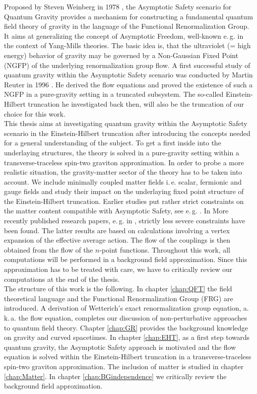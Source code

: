 Proposed by Steven Weinberg in 1978 \cite{Weinberg1980}, the Asymptotic Safety scenario for Quantum Gravity provides a mechanism for constructing a fundamental quantum field theory of gravity in the language of the Functional Renormalization Group. It aims at generalizing the concept of Asymptotic Freedom, well-known e.\,g. in the context of Yang-Mills theories. The basic idea is, that the ultraviolet (= high energy) behavior of gravity may be governed by a Non-Gaussian Fixed Point (NGFP) of the underlying renormalization group flow. A first successful study of quantum gravity within the Asymptotic Safety scenario was conducted by Martin Reuter in 1996 \cite{Reuter1996}. He derived the flow equations and proved the existence of such a NGFP in a pure-gravity setting in a truncated subsystem. The so-called Einstein-Hilbert truncation he investigated back then, will also be the truncation of our choice for this work. \\
This thesis aims at investigating quantum gravity within the Asymptotic Safety scenario in the Einstein-Hilbert truncation after introducing the concepts needed for a general understanding of the subject. To get a first inside into the underlaying structures, the theory is solved in a pure-gravity setting within a transverse-traceless spin-two graviton approximation. In order to probe a more realistic situation, the gravity-matter sector of the theory has to be taken into account. We include minimally coupled matter fields i.\,e. scalar, fermionic and gauge fields and study their impact on the underlaying fixed point structure of the Einstein-Hilbert truncation. Earlier studies put rather strict constraints on the matter content compatible with Asymptotic Safety, see e.\,g. \cite{DonaEichhornPercacci2013}. In More recently published  research papers, e.\,g. in \cite{MeibohmPawlowskiReichert2015, ChristiansenLitimPawlowskiReichert2018}, strictly less severe constraints have been found. The latter results are based on calculations involving a vertex expansion of the effective average action. The flow of the couplings is then obtained from the flow of the $n$-point functions.
 Throughout this work, all computations will be performed in a background field approximation. Since this approximation has to be treated with care, we have to critically review our computations at the end of the thesis. \\
The structure of this work is the following. In chapter \ref{chap:QFT} the field theoretical language and the Functional Renormalization Group (FRG) are introduced. A derivation of Wetterich's exact renormalization group equation, a.\,k.\,a. the flow equation,  completes our discussion of non-perturbative approaches to quantum field theory. Chapter \ref{chap:GR} provides the background knowledge on gravity and curved spacetimes. In chapter \ref{chap:EHT}, as a first step towards quantum gravity, the Asymptotic Safety approach is motivated and the flow equation is solved within the Einstein-Hilbert truncation in a transverse-traceless spin-two graviton approximation. The inclusion of matter is studied in chapter \ref{chap:Matter}. In chapter \ref{chap:BGindependence} we critically review the background field approximation.

